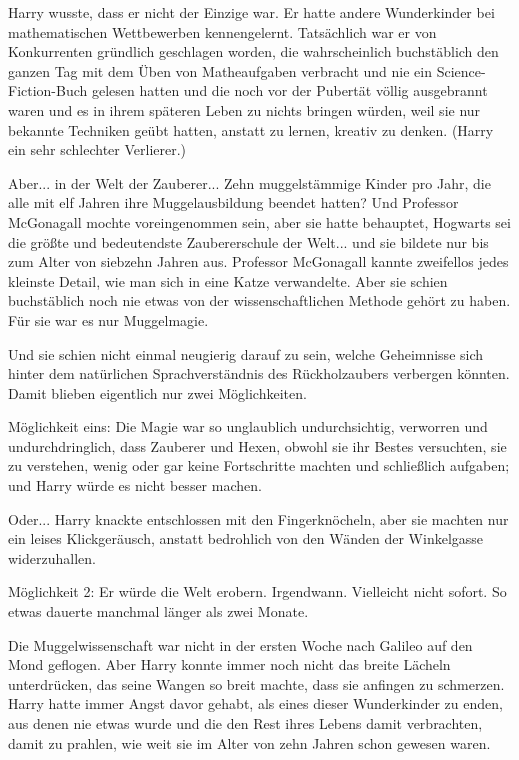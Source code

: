 Harry wusste, dass er nicht der Einzige war. Er hatte andere Wunderkinder bei
mathematischen Wettbewerben kennengelernt. Tatsächlich war er von Konkurrenten
gründlich geschlagen worden, die wahrscheinlich buchstäblich den ganzen Tag mit
dem Üben von Matheaufgaben verbracht und nie ein Science-Fiction-Buch gelesen
hatten und die noch vor der Pubertät völlig ausgebrannt waren und es in ihrem
späteren Leben zu nichts bringen würden, weil sie nur bekannte Techniken geübt
hatten, anstatt zu lernen, kreativ zu denken. (Harry ein sehr schlechter
Verlierer.)

Aber... in der Welt der Zauberer... Zehn muggelstämmige Kinder pro Jahr, die
alle mit elf Jahren ihre Muggelausbildung beendet hatten? Und Professor
McGonagall mochte voreingenommen sein, aber sie hatte behauptet, Hogwarts sei
die größte und bedeutendste Zaubererschule der Welt... und sie bildete nur bis
zum Alter von siebzehn Jahren aus. Professor McGonagall kannte zweifellos jedes
kleinste Detail, wie man sich in eine Katze verwandelte. Aber sie schien
buchstäblich noch nie etwas von der wissenschaftlichen Methode gehört zu haben.
Für sie war es nur Muggelmagie.

Und sie schien nicht einmal neugierig darauf zu sein, welche Geheimnisse sich
hinter dem natürlichen Sprachverständnis des Rückholzaubers verbergen könnten.
Damit blieben eigentlich nur zwei Möglichkeiten.

Möglichkeit eins: Die Magie war so unglaublich undurchsichtig, verworren und
undurchdringlich, dass Zauberer und Hexen, obwohl sie ihr Bestes versuchten, sie
zu verstehen, wenig oder gar keine Fortschritte machten und schließlich
aufgaben; und Harry würde es nicht besser machen.

Oder... Harry knackte entschlossen mit den Fingerknöcheln, aber sie machten nur
ein leises Klickgeräusch, anstatt bedrohlich von den Wänden der Winkelgasse
widerzuhallen.

Möglichkeit 2: Er würde die Welt erobern. Irgendwann. Vielleicht nicht sofort.
So etwas dauerte manchmal länger als zwei Monate.

Die Muggelwissenschaft war nicht in der ersten Woche nach Galileo auf den Mond
geflogen. Aber Harry konnte immer noch nicht das breite Lächeln unterdrücken,
das seine Wangen so breit machte, dass sie anfingen zu schmerzen. Harry hatte
immer Angst davor gehabt, als eines dieser Wunderkinder zu enden, aus denen nie
etwas wurde und die den Rest ihres Lebens damit verbrachten, damit zu prahlen,
wie weit sie im Alter von zehn Jahren schon gewesen waren.

